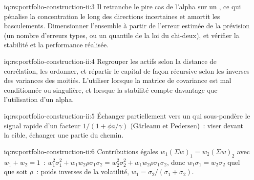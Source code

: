 \begin{solution}{iq:rs:portfolio-construction-ii:3}
Il retranche le pire cas de l'alpha sur un , ce qui pénalise la concentration le long des directions incertaines et amortit les basculements. Dimensionner l'ensemble à partir
de l'erreur estimée de la prévision (un nombre d'erreurs types, ou un quantile de la loi du chi-deux), et vérifier la stabilité et la performance réalisée.
\end{solution}

\begin{solution}{iq:rs:portfolio-construction-ii:4}
Regrouper les actifs selon la distance de corrélation, les ordonner, et répartir le capital de façon récursive selon les inverses des variances des moitiés. L'utiliser lorsque la matrice de covariance est
mal conditionnée ou singulière, et lorsque la stabilité compte davantage que l'utilisation d'un alpha.
\end{solution}

\begin{solution}{iq:rs:portfolio-construction-ii:5}
Échanger partiellement vers un  qui sous-pondère le signal rapide d'un facteur $1/(1 + \phi a/\gamma)$ (Gârleanu et Pedersen)~: viser devant la cible, échanger
une partie du chemin.
\end{solution}

\begin{solution}{iq:rs:portfolio-construction-ii:6}
Contributions égales $w_1(\Sigma w)_1 = w_2(\Sigma w)_2$ avec $w_1 + w_2 = 1$~: $w_1^2\sigma_1^2 + w_1w_2\rho\sigma_1\sigma_2 = w_2^2\sigma_2^2 + w_1w_2\rho\sigma_1\sigma_2$, donc
$w_1\sigma_1 = w_2\sigma_2$ quel que soit $\rho$~: poids inverses de la volatilité, $w_1 = \sigma_2/(\sigma_1 + \sigma_2)$.
\end{solution}
